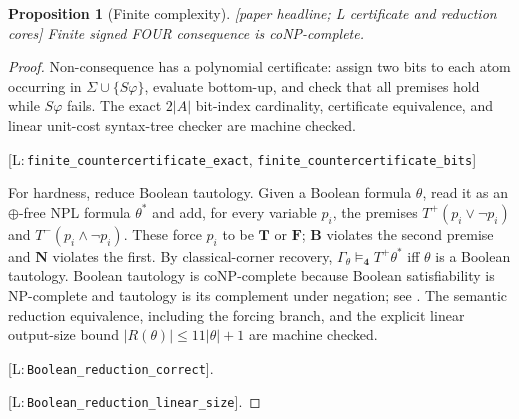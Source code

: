 \documentclass[11pt,a4paper]{article}
\newtheorem{proposition}[theorem]{Proposition}
\theoremstyle{definition}
\newcommand{\FOUR}{\mathbf{4}}
\newcommand{\vT}{\mathbf{T}}
\newcommand{\vF}{\mathbf{F}}
\newcommand{\vB}{\mathbf{B}}
\newcommand{\vN}{\mathbf{N}}
\newcommand{\hmz}{\oplus}                       %
\newcommand{\Tp}{T^{+}}\newcommand{\Tm}{T^{-}}
\newcommand{\lean}[1]{\texttt{#1}}
\begin{document}
\begin{proposition}[Finite complexity]\label{prop:complexity}
\textnormal{[paper headline; L certificate and reduction cores]}
Finite signed FOUR consequence is coNP-complete.
\end{proposition}
\begin{proof}
Non-consequence has a polynomial certificate: assign two bits to each atom
occurring in $\Sigma\cup\{S\varphi\}$, evaluate bottom-up, and check that
all premises hold while $S\varphi$ fails. The exact $2|A|$ bit-index cardinality,
certificate equivalence, and linear unit-cost syntax-tree checker are machine checked.
\par\noindent
\textnormal{\small
[L:\,\lean{finite\_countercertificate\_exact},
\lean{finite\_countercertificate\_bits}]}
\par\noindent
For hardness, reduce Boolean
tautology. Given a Boolean formula $\theta$, read it as an $\hmz$-free NPL
formula $\theta^*$ and add, for every variable $p_i$, the premises
$\Tp(p_i\vee\lnot p_i)$ and $\Tm(p_i\wedge\lnot p_i)$. These force $p_i$
to be $\vT$ or $\vF$; $\vB$ violates the second premise and $\vN$ violates
the first. By classical-corner recovery, $\Gamma_\theta\models_{\FOUR}
\Tp\theta^*$ iff $\theta$ is a Boolean tautology. Boolean tautology is
coNP-complete because Boolean satisfiability is NP-complete and tautology is
its complement under negation; see
\cite{cook1971complexity,karp1972reducibility}.
The semantic reduction equivalence, including the forcing branch, and the explicit
linear output-size bound $|R(\theta)|\le 11|\theta|+1$ are machine checked.
\par\noindent
\textnormal{\small
[L:\,\lean{Boolean\_reduction\_correct}].}
\par\noindent
\textnormal{\small
[L:\,\lean{Boolean\_reduction\_linear\_size}].}
\end{proof}
\end{document}
